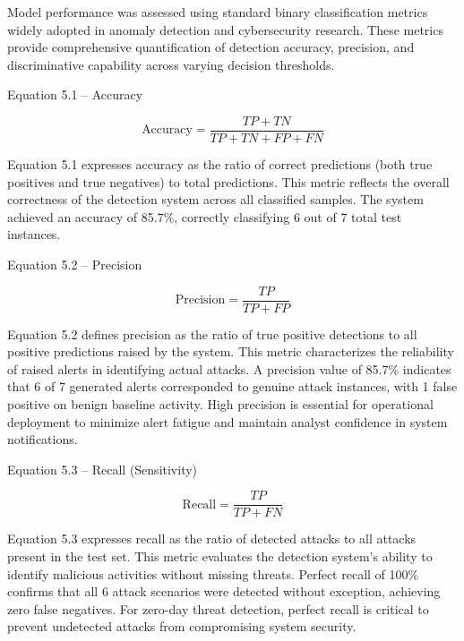 Model performance was assessed using standard binary classification metrics widely adopted in anomaly detection and cybersecurity research. These metrics provide comprehensive quantification of detection accuracy, precision, and discriminative capability across varying decision thresholds.

\noindent
Equation 5.1 -- Accuracy

\begin{equation}
\text{Accuracy} = \frac{TP + TN}{TP + TN + FP + FN}
\label{eq:accuracy}
\end{equation}

Equation 5.1 expresses accuracy as the ratio of correct predictions (both true positives and true negatives) to total predictions. This metric reflects the overall correctness of the detection system across all classified samples. The system achieved an accuracy of 85.7\%, correctly classifying 6 out of 7 total test instances.

\vspace{0.15cm}

\noindent
Equation 5.2 -- Precision

\begin{equation}
\text{Precision} = \frac{TP}{TP + FP}
\label{eq:precision}
\end{equation}

Equation 5.2 defines precision as the ratio of true positive detections to all positive predictions raised by the system. This metric characterizes the reliability of raised alerts in identifying actual attacks. A precision value of 85.7\% indicates that 6 of 7 generated alerts corresponded to genuine attack instances, with 1 false positive on benign baseline activity. High precision is essential for operational deployment to minimize alert fatigue and maintain analyst confidence in system notifications.

\vspace{0.15cm}

\noindent
Equation 5.3 -- Recall (Sensitivity)

\begin{equation}
\text{Recall} = \frac{TP}{TP + FN}
\label{eq:recall}
\end{equation}

Equation 5.3 expresses recall as the ratio of detected attacks to all attacks present in the test set. This metric evaluates the detection system's ability to identify malicious activities without missing threats. Perfect recall of 100\% confirms that all 6 attack scenarios were detected without exception, achieving zero false negatives. For zero-day threat detection, perfect recall is critical to prevent undetected attacks from compromising system security.


